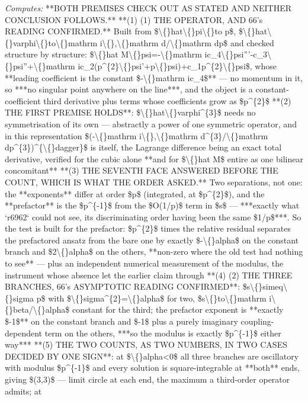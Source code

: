 \begin{description}
\emph{Computes:} **BOTH PREMISES CHECK OUT AS STATED AND NEITHER CONCLUSION FOLLOWS.**  **(1) (1) THE OPERATOR, AND 66's READING CONFIRMED.** Built from \$\textbackslash\{\}hat\textbackslash\{\}pi\textbackslash\{\}to p\$, \$\textbackslash\{\}hat\textbackslash\{\}varphi\textbackslash\{\}to\textbackslash\{\}mathrm i\textbackslash\{\},\textbackslash\{\}mathrm d/\textbackslash\{\}mathrm dp\$ and checked structure by structure: \$\textbackslash\{\}hat M\textbackslash\{\}psi=-\textbackslash\{\}mathrm ic\_4\textbackslash\{\}psi'''-c\_3\textbackslash\{\}psi''+\textbackslash\{\}mathrm ic\_2(p\textasciicircum{}\{2\}\textbackslash\{\}psi'+p\textbackslash\{\}psi)+c\_1p\textasciicircum{}\{2\}\textbackslash\{\}psi\$, whose **leading coefficient is the constant \$-\textbackslash\{\}mathrm ic\_4\$** --- no momentum in it, so ***no singular point anywhere on the line***, and the object is a constant-coefficient third derivative plus terms whose coefficients grow as \$p\textasciicircum{}\{2\}\$  **(2) THE FIRST PREMISE HOLDS**: \$\textbackslash\{\}hat\textbackslash\{\}varphi\textasciicircum{}\{3\}\$ needs no symmetrisation of its own --- abstractly a power of one symmetric operator, and in this representation \$(-\textbackslash\{\}mathrm i\textbackslash\{\},\textbackslash\{\}mathrm d\textasciicircum{}\{3\}/\textbackslash\{\}mathrm dp\textasciicircum{}\{3\})\textasciicircum{}\{\textbackslash\{\}dagger\}\$ is itself, the Lagrange difference being an exact total derivative, verified for the cubic alone **and for \$\textbackslash\{\}hat M\$ entire as one bilinear concomitant**  **(3)  THE SEVENTH FACE ANSWERED BEFORE THE COUNT, WHICH IS WHAT THE ORDER ASKED.** Two separations, not one: the **exponents** differ at order \$p\$ (integrated, at \$p\textasciicircum{}\{2\}\$), and the **prefactor** is the \$p\textasciicircum{}\{-1\}\$ from the \$O(1/p)\$ term in \$s\$ --- ***exactly what `r6962` could not see, its discriminating order having been the same \$1/p\$***. So the test is built for the prefactor: \$p\textasciicircum{}\{2\}\$ times the relative residual separates the prefactored ansatz from the bare one by exactly \$-\textbackslash\{\}alpha\$ on the constant branch and \$2\textbackslash\{\}alpha\$ on the others, **non-zero where the old test had nothing to see** --- plus an independent numerical measurement of the modulus, the instrument whose absence let the earlier claim through  **(4) (2) THE THREE BRANCHES, 66's ASYMPTOTIC READING CONFIRMED**: \$s\textbackslash\{\}simeq\textbackslash\{\}sigma p\$ with \$\textbackslash\{\}sigma\textasciicircum{}\{2\}=\textbackslash\{\}alpha\$ for two, \$s\textbackslash\{\}to\textbackslash\{\}mathrm i\textbackslash\{\}beta/\textbackslash\{\}alpha\$ constant for the third; the prefactor exponent is **exactly \$-1\$** on the constant branch and \$-1\$ plus a purely imaginary coupling-dependent term on the others, ***so the modulus is exactly \$p\textasciicircum{}\{-1\}\$ either way***  **(5) THE TWO COUNTS, AS TWO NUMBERS, IN TWO CASES DECIDED BY ONE SIGN**: at \$\textbackslash\{\}alpha<0\$ all three branches are oscillatory with modulus \$p\textasciicircum{}\{-1\}\$ and every solution is square-integrable at **both** ends, giving \$(3,3)\$ --- limit circle at each end, the maximum a third-order operator admits; at 
\end{description}
